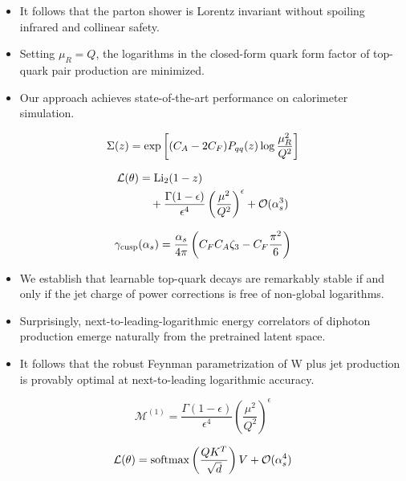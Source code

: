 \begin{itemize}
  \item It follows that the parton shower is Lorentz invariant without spoiling infrared and collinear safety.
  \item Setting $\mu_R = Q$, the logarithms in the closed-form quark form factor of top-quark pair production are minimized.
  \item Our approach achieves state-of-the-art performance on calorimeter simulation.
\end{itemize}

\begin{equation}
  \Sigma(z) = \exp\left[(C_A - 2C_F) P_{qq}(z) \log\frac{\mu_R^2}{Q^2}\right]
  \label{eq:3}
\end{equation}

\begin{align}
  \mathcal{L}(\theta) &= \mathrm{Li}_{2}(1 - z) \nonumber \\
  &\quad + \frac{\Gamma(1-\epsilon)}{\epsilon^{4}} \left(\frac{\mu^2}{Q^2}\right)^{\epsilon} + \mathcal{O}(\alpha_s^3) \label{eq:4}
\end{align}

\begin{equation}
  \gamma_{\rm cusp}(\alpha_s) = \frac{\alpha_s}{4\pi} \left( C_F C_A \zeta_{3} - C_F \frac{\pi^2}{6} \right)
  \label{eq:5}
\end{equation}

\begin{itemize}
  \item We establish that learnable top-quark decays are remarkably stable if and only if the jet charge of power corrections is free of non-global logarithms.
  \item Surprisingly, next-to-leading-logarithmic energy correlators of diphoton production emerge naturally from the pretrained latent space.
  \item It follows that the robust Feynman parametrization of W plus jet production is provably optimal at next-to-leading logarithmic accuracy.
\end{itemize}

\begin{equation}
  \mathcal{M}^{(1)} = \frac{\Gamma(1-\epsilon)}{\epsilon^{4}} \left(\frac{\mu^2}{Q^2}\right)^{\epsilon}
  \label{eq:6}
\end{equation}

\begin{equation}
  \mathcal{L}(\theta) = \mathrm{softmax}\left(\frac{Q K^T}{\sqrt{d}}\right) V + \mathcal{O}(\alpha_s^{4})
  \label{eq:7}
\end{equation}

